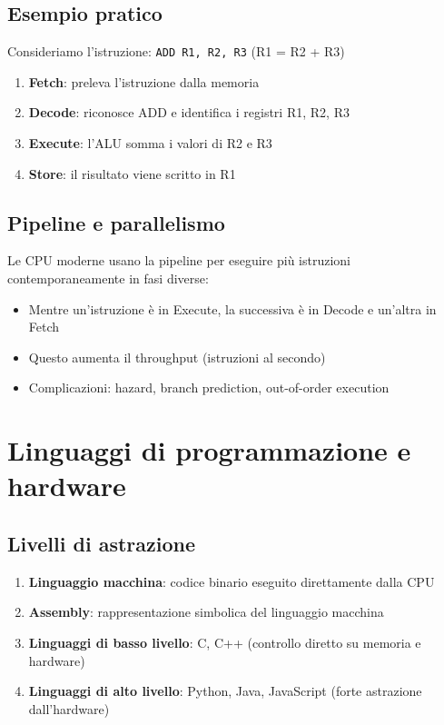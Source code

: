 \documentclass[12pt,a4paper]{article}
\begin{document}
\subsection{Esempio pratico}
Consideriamo l'istruzione: \texttt{ADD R1, R2, R3} (R1 = R2 + R3)

\begin{enumerate}
    \item \textbf{Fetch}: preleva l'istruzione dalla memoria
    \item \textbf{Decode}: riconosce ADD e identifica i registri R1, R2, R3
    \item \textbf{Execute}: l'ALU somma i valori di R2 e R3
    \item \textbf{Store}: il risultato viene scritto in R1
\end{enumerate}

\subsection{Pipeline e parallelismo}
Le CPU moderne usano la pipeline per eseguire più istruzioni contemporaneamente in fasi diverse:
\begin{itemize}
    \item Mentre un'istruzione è in Execute, la successiva è in Decode e un'altra in Fetch
    \item Questo aumenta il throughput (istruzioni al secondo)
    \item Complicazioni: hazard, branch prediction, out-of-order execution
\end{itemize}

\section{Linguaggi di programmazione e hardware}
\subsection{Livelli di astrazione}
\begin{enumerate}
    \item \textbf{Linguaggio macchina}: codice binario eseguito direttamente dalla CPU
    \item \textbf{Assembly}: rappresentazione simbolica del linguaggio macchina
    \item \textbf{Linguaggi di basso livello}: C, C++ (controllo diretto su memoria e hardware)
    \item \textbf{Linguaggi di alto livello}: Python, Java, JavaScript (forte astrazione dall'hardware)
\end{enumerate}
\end{document}
